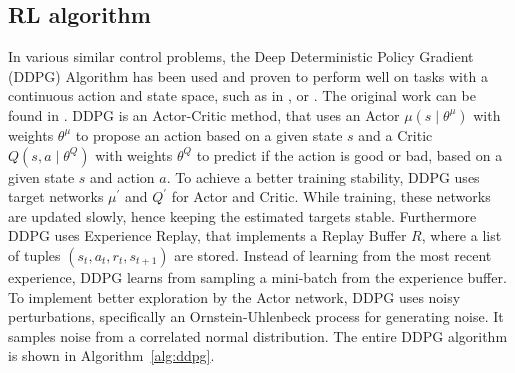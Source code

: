 \documentclass[review]{elsarticle}
\providecommand{\3}{{\ss}}
\begin{document}
  \subsection{\label{RL-algorithm}RL algorithm}
  In various similar control problems, the Deep Deterministic Policy
  Gradient (DDPG) Algorithm has been used and proven to perform well on
  tasks with a continuous action and state space, such as in
  \cite{SafeEfficientAndComfortable}, \cite{ComparisonRLvsMPC} or
  \cite{HumanLikeAutonomouCF}. The original work can be found in
  \cite{DDPG}. DDPG is an Actor-Critic method, that uses an Actor  $\mu\left(s \mid \theta^{\mu}\right)$ with weights $\theta^{\mu} $ to propose an action based on a given state $s$ and a Critic $Q\left(s, a \mid \theta^{Q}\right) $ with weights  $\theta^{Q}$ to predict if the action is good or bad, based on a given state $s$ and action $a$. To achieve a better training stability, DDPG uses target networks  $\mu^{\prime}$ and $Q^{\prime}$ for Actor and Critic. While training, these networks are updated slowly, hence keeping the estimated targets stable. Furthermore DDPG uses Experience Replay, that implements a Replay Buffer $R$, where a list of tuples $\left(s_{t}, a_{t}, r_{t}, s_{t+1}\right)$ are stored. Instead of learning from the most recent experience, DDPG learns from sampling a mini-batch from the experience buffer. To implement better exploration by the Actor network, DDPG uses noisy perturbations, specifically an Ornstein-Uhlenbeck process for generating noise. It samples noise from a correlated normal distribution. The entire DDPG algorithm is shown in Algorithm~\ref{alg:ddpg}. 
  
\end{document}
